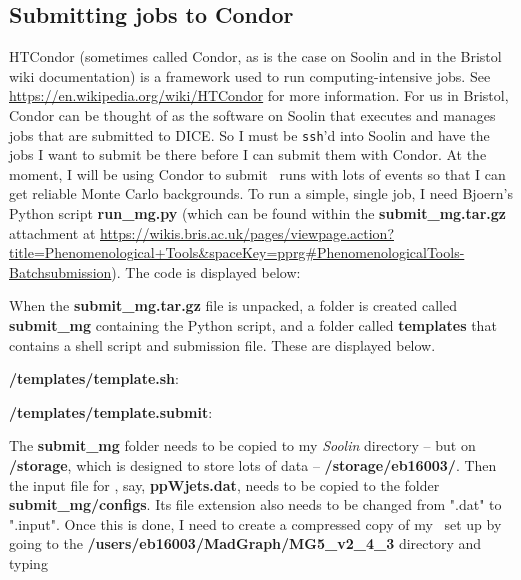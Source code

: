 \subsection{Submitting jobs to Condor}

HTCondor (sometimes called Condor, as is the case on Soolin and in the Bristol wiki documentation) is a framework used to run computing-intensive jobs. See \url{https://en.wikipedia.org/wiki/HTCondor} for more information. For us in Bristol, Condor can be thought of as the software on Soolin that executes and manages jobs that are submitted to DICE. So I must be \verb!ssh!'d into Soolin and have the jobs I want to submit be there before I can submit them with Condor. At the moment, I will be using Condor to submit \madgraph\ runs with lots of events so that I can get reliable Monte Carlo backgrounds. To run a simple, single job, I need Bjoern's Python script \textbf{run\_mg.py} (which can be found within the \textbf{submit\_mg.tar.gz} attachment at \url{https://wikis.bris.ac.uk/pages/viewpage.action?title=Phenomenological+Tools&spaceKey=pprg#PhenomenologicalTools-Batchsubmission}). The code is displayed below:



When the \textbf{submit\_mg.tar.gz} file is unpacked, a folder is created called \textbf{submit\_mg} containing the Python script, and a folder called \textbf{templates} that contains a shell script and submission file. These are displayed below.

\textbf{/templates/template.sh}:



\textbf{/templates/template.submit}:



 The \textbf{submit\_mg} folder needs to be copied to my \emph{Soolin} directory -- but on \textbf{/storage}, which is designed to store lots of data -- \textbf{/storage/eb16003/}. Then the input file for \madgraph, say, \textbf{ppWjets.dat}, needs to be copied to the folder \textbf{submit\_mg/configs}. Its file extension also needs to be changed from ".dat" to ".input". Once this is done, I need to create a compressed copy of my \madgraph\ set up by going to the \textbf{/users/eb16003/MadGraph/MG5\_v2\_4\_3} directory and typing

